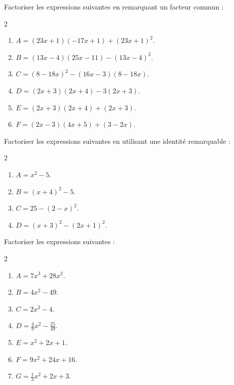 \exo

Factoriser les expressions suivantes en remarquant un facteur commun :

\vspace{-6pt}
\setlength{\columnsep}{1cm}
\setlength{\columnseprule}{0pt}
\begin{multicols}{2}
\begin{enumerate}
\item $A=(23x+1)(-17x+1)+(23x+1)^2$.
\smallskip
\item $B=(13x-4)(25x-11)-(13x-4)^2$.
\smallskip
\item $C=(8-18x)^2-(16x-3)(8-18x)$.

\item $D=(2x+3)(2x+4)-3(2x+3)$.
\smallskip
\item $E=(2x+3)(2x+4)+(2x+3)$.
\smallskip
\item $F=(2x-3)(4x+5)+(3-2x)$.
\end{enumerate}
\end{multicols}
\vspace{-12pt}

\exo

Factoriser les expressions suivantes en utilisant une identité remarquable :

\vspace{-6pt}
\setlength{\columnsep}{1cm}
\setlength{\columnseprule}{0pt}
\begin{multicols}{2}
\begin{enumerate}
\item $A=x^2-5$.
\smallskip
\item $B=(x+4)^2-5$.

\item $C=25-(2-x)^2$.
\smallskip
\item $D=(x+3)^2-(2x+1)^2$.
\end{enumerate}
\end{multicols}
\vspace{-12pt}

\exo

Factoriser les expressions suivantes :

\vspace{-6pt}
\setlength{\columnsep}{1cm}
\setlength{\columnseprule}{0pt}
\begin{multicols}{2}
\begin{enumerate}
\item $A=7x^3+28x^2$.
\smallskip
\item $B=4x^2-49$.
\smallskip
\item $C=2x^2-4$.
\smallskip
\item $D=\frac{4}{9}x^2-\frac{25}{49}$.

\item $E=x^2+2x+1$.
\smallskip
\item $F=9x^2+24x+16$.
\smallskip
\item $G=\frac{1}{3}x^2+2x+3$.
\end{enumerate}
\end{multicols}
\vspace{-12pt}

